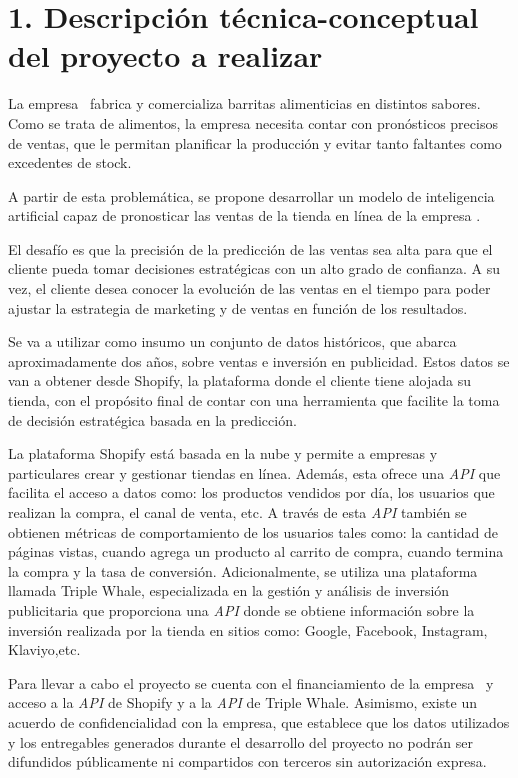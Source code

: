 \documentclass[
11pt, %
]{charter}
\begin{document}
\section{1. Descripción técnica-conceptual del proyecto a realizar}
\label{sec:descripcion}

La empresa \empclientename\ fabrica y comercializa barritas alimenticias en distintos sabores. 
Como se trata de alimentos, la empresa necesita contar con pronósticos precisos de ventas, que le permitan planificar la producción y evitar tanto faltantes como excedentes de stock.

A partir de esta problemática, se propone desarrollar un modelo de inteligencia artificial capaz de pronosticar las ventas de la tienda en línea de la empresa \empclientename. 

El desafío es que la precisión de la predicción de las ventas sea alta para que el cliente pueda tomar decisiones estratégicas con un alto grado de confianza. 
A su vez, el cliente desea conocer la evolución de las ventas en el tiempo para poder ajustar la estrategia de marketing y de ventas en función de los resultados.

Se va a utilizar como insumo un conjunto de datos históricos, que abarca aproximadamente dos años, sobre ventas e inversión en publicidad. 
Estos datos se van a obtener desde Shopify, la plataforma donde el cliente tiene alojada su tienda, con el propósito final de contar con una herramienta que facilite la toma de decisión estratégica basada en la predicción.

La plataforma Shopify está basada en la nube y permite a empresas y particulares crear y gestionar tiendas en línea. 
Además, esta ofrece una \textit{API} que facilita el acceso a datos como: los productos vendidos por día, los usuarios que realizan la compra, el canal de venta, etc. 
A través de esta \textit{API} también se obtienen métricas de comportamiento de los usuarios tales como: la cantidad de páginas vistas, cuando agrega un producto al carrito de compra, cuando termina la compra y la tasa de conversión.
Adicionalmente, se utiliza una plataforma llamada Triple Whale, especializada en la gestión y análisis de inversión publicitaria que proporciona una \textit{API} donde se obtiene información sobre la inversión realizada por la tienda en sitios como: Google, Facebook, Instagram, Klaviyo,etc.

Para llevar a cabo el proyecto se cuenta con el financiamiento de la empresa \empclientename\ y acceso a la \textit{API} de Shopify y a la \textit{API} de Triple Whale. 
Asimismo, existe un acuerdo de confidencialidad con la empresa, que establece que los datos utilizados y los entregables generados durante el desarrollo del proyecto no podrán ser difundidos públicamente ni compartidos con terceros sin autorización expresa.
\end{document}
